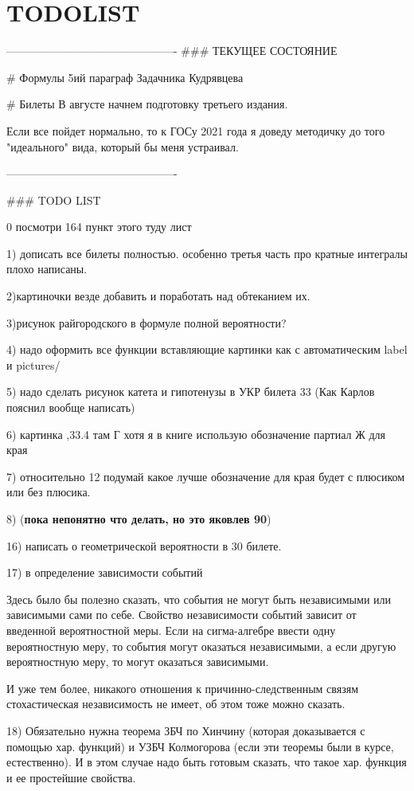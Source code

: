 \chapter{TODOLIST}
----------------------------------------------
### ТЕКУЩЕЕ СОСТОЯНИЕ

# Формулы
5ий параграф Задачника Кудрявцева

# Билеты 
В августе начнем подготовку третьего издания. 

Если все пойдет нормально, то к ГОСу 2021 года я доведу методичку до того "идеального" вида, который бы меня устраивал.

----------------------------------------------

### TODO LIST

0 посмотри 164 пункт этого туду лист

1) дописать все билеты полностью. особенно третья часть про кратные интегралы плохо написаны.

2)картиночки везде добавить и поработать над обтеканием их.
 
3)рисунок райгородского в формуле полной вероятности? 
 
4) надо оформить все функции вставляющие картинки как \usepict с автоматическим label и pictures/
 
5) надо сделать рисунок катета и гипотенузы в УКР билета 33
(Как Карлов пояснил вообще написать)
 
6) картинка ,33.4 там Г хотя я в книге использую обозначение партиал Ж для края

7) относительно 12 подумай какое лучше обозначение для края будет с плюсиком или без плюсика. 

8) (\textbf{пока непонятно что делать, но это яковлев 90})

16) написать о геометрической вероятности в 30 билете.

17) в определение зависимости событий

Здесь было бы полезно сказать, что события не могут быть независимыми или зависимыми сами по себе. Свойство независимости событий зависит от введенной вероятностной меры. Если на сигма-алгебре ввести одну вероятностную меру, то события могут оказаться независимыми, а если другую вероятностную меру, то могут оказаться зависимыми.

И уже тем более, никакого отношения к причинно-следственным связям стохастическая независимость не имеет, об этом тоже можно сказать.

18) Обязательно нужна теорема ЗБЧ по Хинчину (которая доказывается с помощью хар. функций) и УЗБЧ Колмогорова (если эти теоремы были в курсе, естественно). И в этом случае надо быть готовым сказать, что такое хар. функция и ее простейшие свойства.

